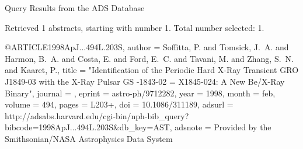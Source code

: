 Query Results from the ADS Database


Retrieved 1 abstracts, starting with number 1.  Total number selected: 1.

@ARTICLE{1998ApJ...494L.203S,
   author = {{Soffitta}, P. and {Tomsick}, J.~A. and {Harmon}, B.~A. and 
	{Costa}, E. and {Ford}, E.~C. and {Tavani}, M. and {Zhang}, S.~N. and 
	{Kaaret}, P.},
    title = "{Identification of the Periodic Hard X-Ray Transient GRO J1849-03 with the X-Ray Pulsar GS -1843-02 = X1845-024: A New Be/X-Ray Binary}",
  journal = {\apjl},
   eprint = {astro-ph/9712282},
     year = 1998,
    month = feb,
   volume = 494,
    pages = {L203+},
      doi = {10.1086/311189},
   adsurl = {http://adsabs.harvard.edu/cgi-bin/nph-bib_query?bibcode=1998ApJ...494L.203S&db_key=AST},
  adsnote = {Provided by the Smithsonian/NASA Astrophysics Data System}
}


